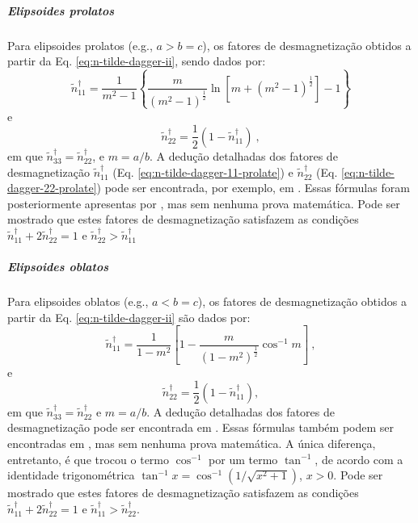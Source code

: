 \subparagraph*{Elipsoides prolatos}

Para elipsoides prolatos (e.g., $a > b = c$), os fatores de desmagnetização
obtidos a partir da Eq. \ref{eq:n-tilde-dagger-ii}, sendo dados por:
\begin{equation}
\tilde{n}^{\dagger}_{11} = \frac{1}{m^{2} - 1}
\left\lbrace \frac{m}{\left( m^{2} - 1 \right)^{\frac{1}{2}}}
\ln \left[ m + \left( m^{2} - 1 \right)^{\frac{1}{2}} \right]
- 1 \right\rbrace
\label{eq:n-tilde-dagger-11-prolate}
\end{equation}
e
\begin{equation}
\tilde{n}^{\dagger}_{22} = \frac{1}{2} \left(1 - \tilde{n}^{\dagger}_{11} \right) \: ,
\label{eq:n-tilde-dagger-22-prolate}
\end{equation}
em que $\tilde{n}^{\dagger}_{33} = \tilde{n}^{\dagger}_{22}$, 
e $m = a/b$.
A dedução detalhadas dos fatores de desmagnetização 
$\tilde{n}^{\dagger}_{11}$ (Eq. \ref{eq:n-tilde-dagger-11-prolate}) 
e $\tilde{n}^{\dagger}_{22}$ (Eq. \ref{eq:n-tilde-dagger-22-prolate})
pode ser encontrada, por exemplo, em \citet{stoner1945}. 
Essas fórmulas foram posteriormente apresentas por
\citet{emerson1985}, mas sem nenhuma prova matemática.
Pode ser mostrado que estes fatores de desmagnetização satisfazem as condições $\tilde{n}^{\dagger}_{11} + 2 \tilde{n}^{\dagger}_{22} = 1$ e $\tilde{n}^{\dagger}_{22} > \tilde{n}^{\dagger}_{11}$

\subparagraph*{Elipsoides oblatos}

Para elipsoides oblatos (e.g., $a < b = c$), os fatores de desmagnetização obtidos 
a partir da Eq. \ref{eq:n-tilde-dagger-ii} são dados por:
\begin{equation}
\tilde{n}^{\dagger}_{11} = 
\frac{1}{1 - m^{2}} \left[
1 - \frac{m}{\left( 1 - m^{2} \right)^{\frac{1}{2}}} \cos^{-1}m
\right] \: ,
\label{eq:n-tilde-dagger-11-oblate}
\end{equation}
e
\begin{equation}
\tilde{n}^{\dagger}_{22} = 
\frac{1}{2} \left(1 - \tilde{n}^{\dagger}_{11}\right) ,
\label{eq:n-tilde-dagger-22-oblate}
\end{equation}
em que $\tilde{n}^{\dagger}_{33}=\tilde{n}^{\dagger}_{22}$ e $m = a/b$.
A dedução detalhadas dos fatores de desmagnetização 
pode ser encontrada em \citet{stoner1945}.  Essas fórmulas
também podem ser encontradas em \citet{emerson1985}, mas sem nenhuma prova matemática.
A única diferença, entretanto, é que \citet{emerson1985} trocou o termo $\cos^{-1}$
por um termo $\tan^{-1}$, de acordo com a identidade trigonométrica
$\tan^{-1}x = \cos^{-1}(1/\sqrt{x^{2} + 1})$, $x > 0$. Pode ser mostrado que estes fatores de desmagnetização satisfazem as condições $\tilde{n}^{\dagger}_{11} + 2 \tilde{n}^{\dagger}_{22} = 1$ e $\tilde{n}^{\dagger}_{11} > \tilde{n}^{\dagger}_{22}$.

